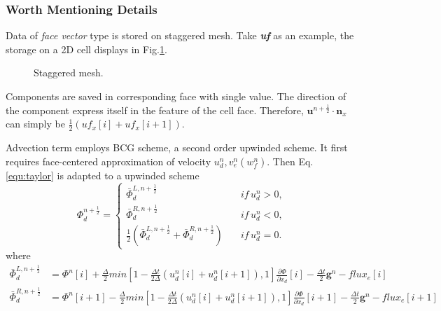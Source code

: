 \documentclass[a4paper]{article}
\newcommand{\para}[1]{\textbf{\emph{\textcolor{para}{#1}}}}
\begin{document}
\subsubsection{Worth Mentioning Details}\label{sec:tracerdetail}
Data of \emph{face vector} type is stored on staggered mesh\cite{harlow1965numerical}. Take \para{uf} as an example, the storage on a 2D cell displays in Fig.\ref{fig:staggered}.
\begin{figure}[H]
     \centering
     \begin{center}
     \end{center}
     \caption{Staggered mesh.}
     \label{fig:staggered}
\end{figure}
Components are saved in corresponding face with single value. The direction of the component express itself in the feature of the cell face. Therefore, $ \mathbf{u}^{n + \frac{1}{2}} \cdot \mathbf{n}_x$ can simply be $ \frac{1}{2}(uf_x[i]+uf_x[i+1])$.\par
Advection term employs BCG scheme\cite{martin2000cell}, a second order upwinded scheme. It first requires face-centered approximation of velocity $u_d^n,v_e^n(w_f^n)$. Then Eq.\ref{equ:taylor} is adapted to a upwinded scheme
\begin{equation}
  \Phi_d^{n+ \frac{1}{2}}=
    \left \{ 
    \begin{array}{cc}
      \bar{\Phi}^{L,n+ \frac{1}{2}}_d\quad &if\, u_d^n>0,\\
      \bar{\Phi}^{R,n+ \frac{1}{2}}_d\quad &if\, u_d^n<0,\\
      \frac{1}{2}(\bar{\Phi}^{L,n+ \frac{1}{2}}_d+\bar{\Phi}^{R,n+ \frac{1}{2}}_d)\quad &if \,u_d^n=0.
    \end{array}
    \right.
\end{equation}
where
\begin{align}
  \bar{\Phi}^{L,n+ \frac{1}{2}}_d &= \Phi^n[i] + \frac{\Delta}{2}min[1- \frac{\Delta t}{2\Delta}(u_d^n[i]+u_d^n[i+1]),1] \frac{\partial \Phi}{\partial x_d}[i]- \frac{\Delta t}{2} \mathbf{g}^n-flux_e[i]\\
  \bar{\Phi}^{R,n+ \frac{1}{2}}_d &= \Phi^n[i+1] - \frac{\Delta}{2}min[1- \frac{\Delta t}{2\Delta}(u_d^n[i]+u_d^n[i+1]),1]\frac{\partial \Phi}{\partial x_d}[i+1]- \frac{\Delta t}{2} \mathbf{g}^n-flux_e[i+1]
\end{align}
\end{document}
